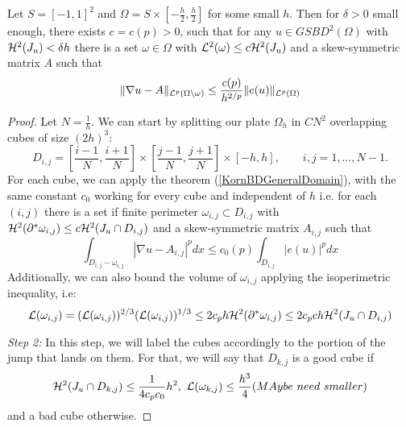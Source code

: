     \begin{theorem} Let $S=[-1,1]^2$ and $\Omega = S\times[-\frac{h}{2},\frac{h}{2}]$ for some small $h$. Then for $\delta>0$ small enough, there exists $c = c(p)>0$, such that for any $u\in GSBD^2(\Omega)$ with ${\mathcal H}^2(J_u)<\delta h$ there is a set $\omega\in\Omega$ with ${\mathcal L}^2(\omega)\leq c {\mathcal H}^2(J_u)$  and a skew-symmetric matrix $A$ such that
    $$\|\nabla u-A\|_{{\mathcal L}^p(\Omega \backslash \omega)} \leq \frac{c(p)}{h^{2/p}} \|e(u)\|_{{\mathcal L}^p(\Omega)}$$
    \end{theorem}
    \begin{proof}
    Let $N=\frac{1}{h}$. We can start by splitting our plate $\Omega_h$ in $CN^2$ overlapping cubes of size $(2h)^3$:
    $$D_{i,j}=[\frac{i-1}{N},\frac{i+1}{N}]\times[\frac{j-1}{N},\frac{j+1}{N}]\times[-h,h],\qquad i,j=1,\ldots,N-1.$$
    For each cube, we can apply the theorem (\ref{KornBDGeneralDomain}), with the same constant $c_0$ working for every cube and independent of $h$ i.e. for each $(i,j)$ there is a set if finite perimeter $\omega_{i,j}\subset D_{i,j}$ with ${\mathcal H}^2(\partial^*\omega_{i,j})\leq c {\mathcal H}^2(J_u\cap D_{i,j})$ and a skew-symmetric matrix $A_{i,j}$ such that 
    \begin{equation}\label{kornkj}
    \int_{D_{i,j}-\omega_{i,j} }|\nabla u- A_{i,j}|^p d x \leq c_0(p) \int_{D_{i,j}}|e(u)|^p d x
    \end{equation}
     Additionally, we can also bound the  volume of $\omega_{i,j}$ applying the isoperimetric inequality, i.e:
    $${\mathcal L}(\omega_{i,j})=({\mathcal L}(\omega_{i,j}))^{2/3}({\mathcal L}(\omega_{i,j}))^{1/3}\leq 2c_ph {\mathcal H}^2(\partial^*\omega_{i,j})\leq 2c_pch{\mathcal H}^2(J_u\cap D_{i,j})$$
    
    
    \textit{Step 2:}
    In this step, we will label the cubes accordingly to the portion of the jump that lands on them. For that, we will say that $D_{k,j}$ is a good cube if 
    $${\mathcal H}^2(J_u\cap D_{k,j})\leq \frac{1}{4c_pc_0} h^2, \ {\mathcal L}(\omega_{k,j})\leq \frac{h^3}{4}(MAybe\ need \ smaller)$$
    and a bad cube otherwise. 
    

\end{proof}
